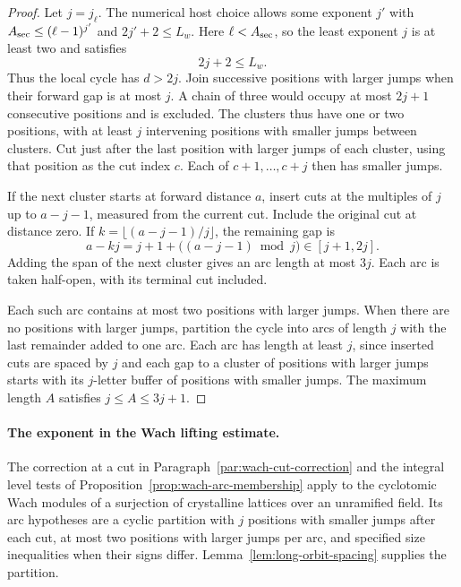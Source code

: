 \begin{proof}
Let \(j=j_\ell\). The numerical host choice allows some exponent
\(j'\) with \(A_{\rm sec}\le(\ell-1)^{j'}\) and \(2j'+2\le L_w\).
Here \(\ell<A_{\rm sec}\), so the least exponent \(j\) is at least two
and satisfies
\[
 2j+2\le L_w.
\]
Thus the local cycle has \(d>2j\).
Join successive positions with larger jumps when their forward gap is at most
\(j\). A chain of three would occupy at most \(2j+1\) consecutive
positions and is excluded. The clusters thus have one or two
positions, with at least \(j\) intervening positions with smaller jumps between
clusters. Cut just after the last position with larger jumps of each cluster,
using that position as the cut index \(c\). Each of \(c+1,\dots,c+j\)
then has smaller jumps.

If the next cluster starts at forward distance \(a\),
insert cuts at the multiples of \(j\) up to \(a-j-1\), measured
from the current cut. Include the original cut at distance zero. If
\(k=\lfloor(a-j-1)/j\rfloor\), the remaining gap is
\[
 a-kj=j+1+\bigl((a-j-1)\bmod j\bigr)\in[j+1,2j].
\] Adding the span of the next
cluster gives an arc length at most \(3j\). Each arc is taken
half-open, with its terminal cut included.

Each such arc contains at most two
positions with larger jumps. When there are no positions with larger jumps, partition the
cycle into arcs of length \(j\) with the last remainder added to one
arc. Each arc has length at least \(j\), since inserted cuts are
spaced by \(j\) and each gap to a cluster of positions with larger jumps starts with its
\(j\)-letter buffer of positions with smaller jumps. The maximum length \(A\) satisfies
\(j\le A\le3j+1\).
\end{proof}

\paragraph{The exponent in the Wach lifting estimate.}\label{par:inert-cut-exponents}
The correction at a cut in Paragraph~\ref{par:wach-cut-correction} and the integral level tests of Proposition~\ref{prop:wach-arc-membership} apply to the
cyclotomic Wach modules of a surjection of crystalline lattices over
an unramified field. Its arc hypotheses are a cyclic partition with
\(j\) positions with smaller jumps after each cut, at most two positions with larger jumps per
arc, and specified size inequalities when their signs differ.
Lemma~\ref{lem:long-orbit-spacing} supplies the partition.


